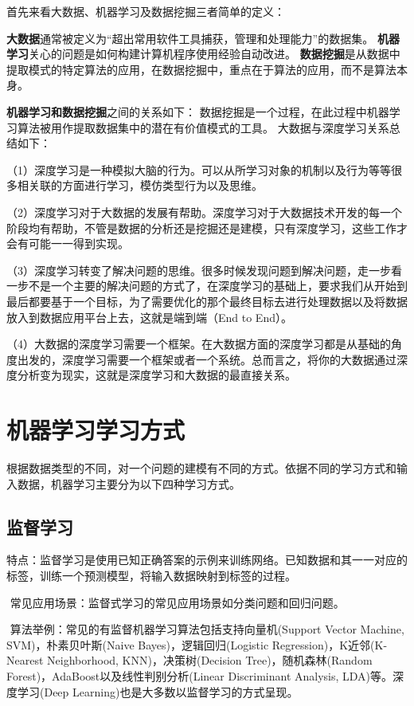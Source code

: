 首先来看大数据、机器学习及数据挖掘三者简单的定义：

\textbf{大数据}通常被定义为``超出常用软件工具捕获，管理和处理能力''的数据集。
\textbf{机器学习}关心的问题是如何构建计算机程序使用经验自动改进。
\textbf{数据挖掘}是从数据中提取模式的特定算法的应用，在数据挖掘中，重点在于算法的应用，而不是算法本身。

\textbf{机器学习和数据挖掘}之间的关系如下：
数据挖掘是一个过程，在此过程中机器学习算法被用作提取数据集中的潜在有价值模式的工具。
大数据与深度学习关系总结如下：

（1）深度学习是一种模拟大脑的行为。可以从所学习对象的机制以及行为等等很多相关联的方面进行学习，模仿类型行为以及思维。

（2）深度学习对于大数据的发展有帮助。深度学习对于大数据技术开发的每一个阶段均有帮助，不管是数据的分析还是挖掘还是建模，只有深度学习，这些工作才会有可能一一得到实现。

（3）深度学习转变了解决问题的思维。很多时候发现问题到解决问题，走一步看一步不是一个主要的解决问题的方式了，在深度学习的基础上，要求我们从开始到最后都要基于一个目标，为了需要优化的那个最终目标去进行处理数据以及将数据放入到数据应用平台上去，这就是端到端（End
to End）。

（4）大数据的深度学习需要一个框架。在大数据方面的深度学习都是从基础的角度出发的，深度学习需要一个框架或者一个系统。总而言之，将你的大数据通过深度分析变为现实，这就是深度学习和大数据的最直接关系。

\section{机器学习学习方式}\label{ux673aux5668ux5b66ux4e60ux5b66ux4e60ux65b9ux5f0f}

​
根据数据类型的不同，对一个问题的建模有不同的方式。依据不同的学习方式和输入数据，机器学习主要分为以下四种学习方式。

\subsection{ 监督学习}\label{ux76d1ux7763ux5b66ux4e60}

​
特点：监督学习是使用已知正确答案的示例来训练网络。已知数据和其一一对应的标签，训练一个预测模型，将输入数据映射到标签的过程。

​ 常见应用场景：监督式学习的常见应用场景如分类问题和回归问题。

​ 算法举例：常见的有监督机器学习算法包括支持向量机(Support Vector
Machine, SVM)，朴素贝叶斯(Naive Bayes)，逻辑回归(Logistic
Regression)，K近邻(K-Nearest Neighborhood, KNN)，决策树(Decision
Tree)，随机森林(Random Forest)，AdaBoost以及线性判别分析(Linear
Discriminant Analysis, LDA)等。深度学习(Deep
Learning)也是大多数以监督学习的方式呈现。

